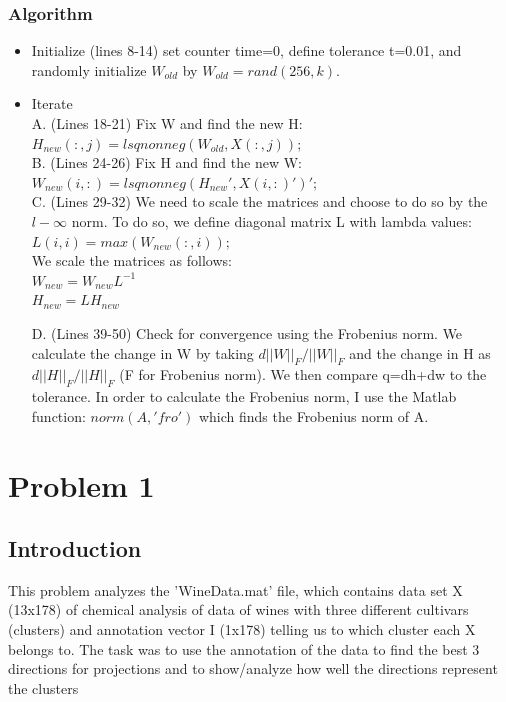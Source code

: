 \documentclass{article}
\begin{document}
    \subsubsection*{Algorithm}
        \begin{itemize}
        \item Initialize (lines 8-14) set counter time=0, define tolerance t=0.01, and randomly initialize $W_{old}$ by $W_{old}=rand(256,k)$.
            
        \item {Iterate}\\
                A.  (Lines 18-21) Fix W and find the new H: \\$H_{new}(:,j)=lsqnonneg(W_{old},X(:,j));$\\
                
                B.  (Lines 24-26) Fix H and find the new W:         \\$W_{new}(i,:)=lsqnonneg(H_{new}',X(i,:)')';$\\
    
                C.  (Lines 29-32) We need to scale the matrices and choose to do so by the $l-\infty$ norm.  To do so, we define diagonal matrix L with lambda values:     
                $L(i,i)=max(W_{new}(:,i));$\\
                We scale the matrices as follows:
                \\$W_{new}=W_{new}L^{-1}$\\
                $H_{new}=LH_{new}$
                
                D.  (Lines 39-50) Check for convergence using the Frobenius norm.  We calculate the change in W by taking  $d||W||_F/||W||_F$ and the change in H as $d||H||_F/||H||_F$ (F for Frobenius norm).  We then compare q=dh+dw to the tolerance.  In order to calculate the Frobenius norm, I use the Matlab function: $norm(A,  'fro')$ which finds the Frobenius norm of A.
    
    
    \end{itemize}

\section*{Problem 1}
\subsection*{Introduction}
This problem analyzes the 'WineData.mat' file, which contains data set X (13x178) of chemical analysis of data of wines with three different cultivars (clusters) and annotation vector I (1x178) telling us to which cluster each X belongs to.  The task was to use the annotation of the data to find the best 3 directions for projections and to show/analyze how well the directions represent the clusters
\end{document}
